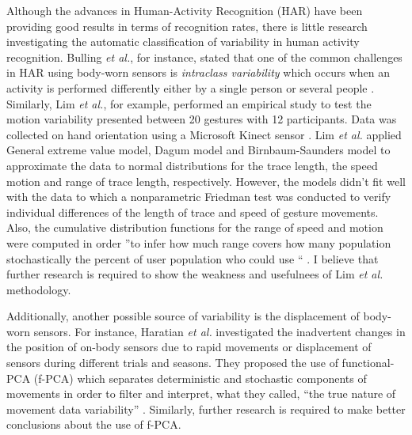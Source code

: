 \documentclass[9pt,journal,onecolumn,compsoc]{IEEEtran}
\begin{document}
Although the advances in Human-Activity Recognition (HAR) have been providing good results in terms of recognition rates,
there is little research investigating the automatic classification of variability in human activity recognition.
Bulling \textit{et al.}, for instance, stated that one of the common challenges in HAR 
using body-worn sensors is \textit{intraclass variability} which occurs when 
an activity is performed differently either by a single person or several people \cite{bulling2014} . 
Similarly, Lim \textit{et al.}, for example, performed an empirical study to test the motion variability 
presented between 20 gestures with 12 participants. %
Data was collected on hand orientation using a Microsoft Kinect sensor \cite{Lim2012}. %
Lim \textit{et al.} 
applied General extreme value model, Dagum model and Birnbaum-Saunders model 
to approximate the data to normal distributions 
for the trace length, the speed motion and range of trace length, respectively.
However, the models didn't fit well with the data to which a nonparametric Friedman test
was conducted to verify individual differences
of the length of trace and speed of gesture movements.
Also, the cumulative distribution functions for
the range of speed and motion were computed 
in order ''to infer how much range covers how many population stochastically 
the percent of user population who could use `` \cite{Lim2012}. 
I believe that further research is required to show the weakness and usefulnees of 
Lim \textit{et al.}  methodology.

Additionally, another possible source of variability is the displacement of body-worn sensors. 
For instance, Haratian \textit{et al.} investigated the inadvertent changes in the position of on-body sensors 
due to rapid movements or displacement of sensors during different trials and seasons.
They proposed the use of functional-PCA (f-PCA)
which separates deterministic and stochastic components of movements
in order to filter and interpret, what they called, ``the true nature of movement data variability'' 
\cite{Haratian2012,Haratian2014,Haratian2016}. Similarly, further research is required to make
better conclusions about the use of f-PCA.
\end{document}
